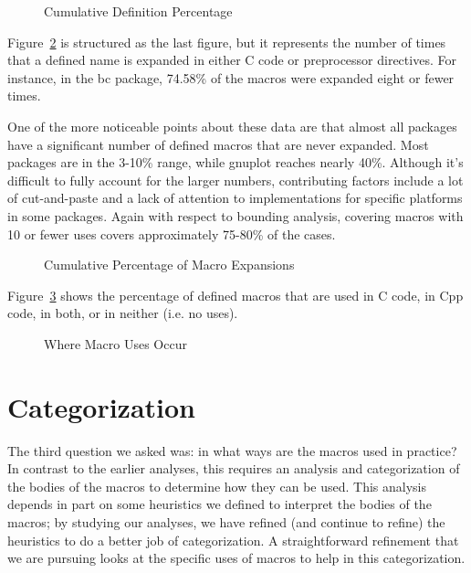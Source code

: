 \begin{figure}
{\small
  \setlength{\tabcolsep}{.25em}
}
\caption{Cumulative Definition Percentage\label{fig:define_count}}
\end{figure}

Figure~\ref{fig:use_count} is structured as the last figure, but it
represents the number of times that a defined name is expanded in
either C code or preprocessor directives.  For instance, in the bc
package, 74.58\% of the macros were expanded eight or fewer times.  

One of the more noticeable points about these data are that almost all
packages have a significant number of defined macros that are never
expanded.  Most packages are in the 3-10\% range, while gnuplot
reaches nearly 40\%.  Although it's difficult to fully account for the
larger numbers, contributing factors include a lot of cut-and-paste
and a lack of attention to implementations for specific platforms in
some packages.  Again with respect to bounding analysis, covering
macros with 10 or fewer uses covers approximately 75-80\% of the cases.

\begin{figure}
{\small
  \setlength{\tabcolsep}{.25em}
}
\caption{Cumulative Percentage of Macro Expansions\label{fig:use_count}}
\end{figure}

Figure~\ref{fig:define_usage} shows the percentage of defined macros
that are used in C code, in Cpp code, in both, or in neither (i.e. no
uses).

\begin{figure}
{\small
  \setlength{\tabcolsep}{.25em}
}
\caption{Where Macro Uses Occur\label{fig:define_usage}}
\end{figure}


\section{Categorization}\label{sec:categorization}

The third question we asked was: in what ways are the macros used in
practice?  In contrast to the earlier analyses, this requires an
analysis and categorization of the bodies of the macros to determine
how they can be used.  This analysis depends in part on some
heuristics we defined to interpret the bodies of the macros; by
studying our analyses, we have refined (and continue to refine) the
heuristics to do a better job of categorization.  A straightforward
refinement that we are pursuing looks at the specific uses of macros
to help in this categorization.

